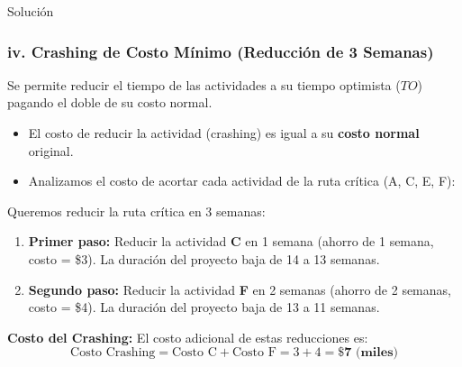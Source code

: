 \documentclass[11pt, a4paper]{article}
\begin{document}
\begin{ejercicio}{Solución}
  \subsubsection*{iv. Crashing de Costo Mínimo (Reducción de 3 Semanas)}
  Se permite reducir el tiempo de las actividades a su tiempo optimista ($TO$) pagando el doble de su costo normal.
  \begin{itemize}
    \item El costo de reducir la actividad (crashing) es igual a su \textbf{costo normal} original.
    \item Analizamos el costo de acortar cada actividad de la ruta crítica (A, C, E, F):
  \end{itemize}
  
  \begin{center}
  \small
  \end{center}

  Queremos reducir la ruta crítica en 3 semanas:
  \begin{enumerate}
    \item \textbf{Primer paso:} Reducir la actividad \textbf{C} en 1 semana (ahorro de 1 semana, costo = \$3). La duración del proyecto baja de 14 a 13 semanas.
    \item \textbf{Segundo paso:} Reducir la actividad \textbf{F} en 2 semanas (ahorro de 2 semanas, costo = \$4). La duración del proyecto baja de 13 a 11 semanas.
  \end{enumerate}
  
  \textbf{Costo del Crashing:}
  El costo adicional de estas reducciones es:
  \begin{equation*}
    \text{Costo Crashing} = \text{Costo C} + \text{Costo F} = 3 + 4 = \mathbf{\$7 \text{ (miles)}}
  \end{equation*}


\end{ejercicio}
\end{document}

